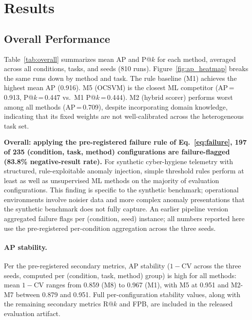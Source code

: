 
\section{Results}
\label{sec:results}

\subsection{Overall Performance}

Table~\ref{tab:overall} summarizes mean AP and P@$k$ for each method, averaged
across all conditions, tasks, and seeds (810 runs). Figure~\ref{fig:ap_heatmap}
breaks the same runs down by method and task. The rule baseline (M1) achieves
the highest mean AP (0.916). M5 (OCSVM) is the closest ML competitor (AP\,=\,0.913,
P@$k$\,=\,0.447 vs.\ M1 P@$k$\,=\,0.444). M2 (hybrid scorer) performs worst among
all methods (AP\,=\,0.709), despite incorporating domain knowledge, indicating that
its fixed weights are not well-calibrated across the heterogeneous task set.



\textbf{Overall: applying the pre-registered failure rule of
Eq.~\eqref{eq:failure}, 197 of 235 (condition, task, method) configurations are
failure-flagged (83.8\% negative-result rate).} For synthetic cyber-hygiene
telemetry with structured, rule-exploitable anomaly injection, simple threshold
rules perform at least as well as unsupervised ML methods on the majority of
evaluation configurations. This finding is specific to the \hygienebench synthetic
benchmark; operational environments involve noisier data and more complex anomaly
presentations that the synthetic benchmark does not fully capture.
An earlier pipeline version aggregated failure flags per (condition, seed)
instance; all numbers reported here use the pre-registered per-condition
aggregation across the three seeds.

\paragraph{AP stability.}
Per the pre-registered secondary metrics, AP stability ($1-\text{CV}$ across the
three seeds, computed per (condition, task, method) group) is high for all
methods: mean $1-\text{CV}$ ranges from 0.859 (M8) to 0.967 (M1), with M5 at
0.951 and M2-M7 between 0.879 and 0.951. Full per-configuration stability
values, along with the remaining secondary metrics R@$k$ and FPB, are included
in the released evaluation artifact.

